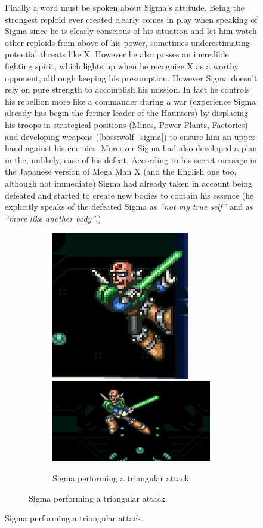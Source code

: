 \begin{figure}[htp]
Finally a word must be spoken about Sigma's attitude. Being the strongest reploid ever created clearly comes in play when speaking of Sigma since he is clearly conscious of his situation and let him watch other reploids from above of his power, sometimes underestimating potential threats like X. However he also posses an incredible fighting spirit, which lights up when he recognize X as a worthy opponent, although keeping his presumption. However Sigma doesn't rely on pure strength to accomplish his mission. In fact he controls his rebellion more like a commander during a war (experience Sigma already has begin the former leader of the Haunters) by displacing his troops in strategical positions (Mines, Power Plants, Factories) and developing weapons (\ref{boss:wolf_sigma}) to ensure him an upper hand against his enemies. Moreover Sigma had also developed a plan in the, unlikely, case of his defeat. According to his secret message in the Japanese version of Mega Man X (and the English one too, although not immediate) Sigma had already taken in account being defeated and started to create new bodies to contain his essence (he explicitly speaks of the defeated Sigma as \textit{``not my true self''} and as \textit{``more like another body''}\cite{wordpress:X_japanese_script}.)
\begin{figure}[htp]
	\centering
	\begin{subfigure}{\linewidth}
		\centering
		\includegraphics[width=0.3\linewidth]{figures/X1/Sigma_stages/Sigma_leap_3.jpg}
		\includegraphics[width=0.64
		\linewidth]{figures/X1/Sigma_stages/Sigma_leap.jpg}
		\caption{Sigma performing a triangular attack.}
	\end{subfigure}

\end{figure}
\end{figure}
